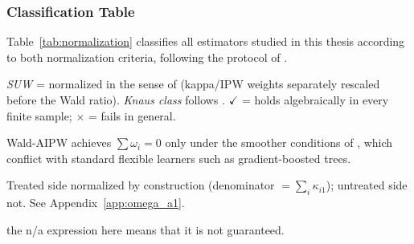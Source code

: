 \documentclass[12pt, a4paper, oneside]{article}
\theoremstyle{plain}
\theoremstyle{definition}
\begin{document}
\subsubsection{Classification Table}
\label{sssec:class_table}

Table~\ref{tab:normalization} classifies all estimators studied in this thesis according
to both normalization criteria, following the protocol of \citet[Table~4--5]{knaus2024treatment}.

\begin{table}[t]
\centering
\caption{Normalization classification of kappa and DML estimators}
\label{tab:normalization}
\begin{threeparttable}
\renewcommand{\arraystretch}{1.3}
\begin{tablenotes}[flushleft]
  \footnotesize
  \item \textit{SUW} = normalized in the sense of \citet{sloczynski2025abadie}
  (kappa/IPW weights separately rescaled before the Wald ratio).
  \textit{Knaus class} follows \citet[Tables~4--5]{knaus2024treatment}.
  $\checkmark$ = holds algebraically in every finite sample; $\times$ = fails in general.
  \item[$^{a}$] Wald-AIPW achieves $\sum\omega_i{=}0$ only under the smoother
  conditions of \citet[Section~4.2.3]{knaus2024treatment}, which conflict with
  standard flexible learners such as gradient-boosted trees.
  \item[$^{b}$] Treated side normalized by construction (denominator
  $=\sum_i\kappa_{i1}$); untreated side not. See Appendix~\ref{app:omega_a1}.
  \item[$^{c}$] the n/a expression here means that it is not guaranteed.
\end{tablenotes}
\end{threeparttable}
\end{table}
\end{document}
